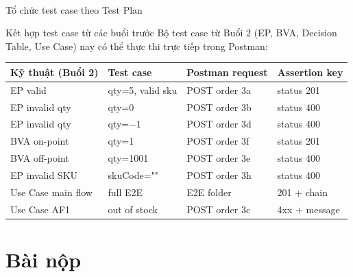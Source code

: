 \documentclass[aspectratio=169,10pt]{beamer}
\newcommand{\sref}[1]{\textsuperscript{\scriptsize\cite{#1}}}
\begin{document}
\begin{frame}[shrink=8]{Tổ chức test case theo Test Plan\sref{istqb}}
  \begin{block}{Kết hợp test case từ các buổi trước}
    Bộ test case từ Buổi 2 (EP, BVA, Decision Table, Use Case)
    nay có thể thực thi trực tiếp trong Postman:
  \end{block}

  \vspace{0.3em}
  \begin{center}
  \small
  \begin{tabular}{p{2.2cm}p{2.5cm}p{2.8cm}p{2.3cm}}
    \toprule
    \textbf{Kỹ thuật (Buổi 2)} & \textbf{Test case} & \textbf{Postman request} & \textbf{Assertion key} \\
    \midrule
    EP valid      & qty=5, valid sku  & POST order 3a & status 201 \\
    EP invalid qty & qty=0            & POST order 3b & status 400 \\
    EP invalid qty & qty=$-1$         & POST order 3d & status 400 \\
    BVA on-point  & qty=1             & POST order 3f & status 201 \\
    BVA off-point & qty=1001          & POST order 3e & status 400 \\
    EP invalid SKU & skuCode=""       & POST order 3h & status 400 \\
    Use Case main flow & full E2E     & E2E folder    & 201 + chain \\
    Use Case AF1  & out of stock      & POST order 3c & 4xx + message \\
    \bottomrule
  \end{tabular}
  \end{center}
\end{frame}

\section{Bài nộp}
\end{document}

